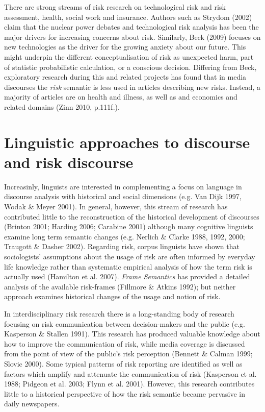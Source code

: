 \documentclass{report}
\begin{document}
There are strong streams of risk research on technological risk and risk assessment, health, social work and insurance. Authors such as Strydom (2002) claim that the nuclear power debates and technological risk analysis has been the major drivers for increasing concerns about risk. Similarly, Beck (2009) focuses on new technologies as the driver for the growing anxiety about our future. This might underpin the different conceptualisation of risk as unexpected harm, part of statistic probabilistic calculation, or a conscious decision. Differing from Beck, exploratory research during this and related projects has found that in media discourses the \emph{risk} semantic is less used in articles describing new risks. Instead, a majority of articles are on health and illness, as well as and economics and related domains (Zinn 2010, p.111f.).

\section{Linguistic approaches to discourse and risk discourse}

Increasinly, linguists are interested in complementing a focus on language in discourse analysis with historical and social dimensions (e.g. Van Dijk 1997, Wodak \& Meyer 2001). In general, however, this stream of research has contributed little to the reconstruction of the historical development of discourses (Brinton 2001; Harding 2006; Carabine 2001) although many cognitive linguists examine long term semantic changes (e.g. Nerlich \& Clarke 1988, 1992, 2000; Traugott \& Dasher 2002). Regarding risk, corpus linguists have shown that sociologists' assumptions about the usage of risk are often informed by everyday life knowledge rather than systematic empirical analysis of how the term risk is actually used (Hamilton et al. 2007). \emph{Frame Semantics} has provided a detailed analysis of the available risk-frames (Fillmore \& Atkins 1992); but neither approach examines historical changes of the usage and notion of risk.

In interdisciplinary risk research there is a long-standing body of research focusing on risk communication between decision-makers and the public (e.g. Kasperson \& Stallen 1991). This research has produced valuable knowledge about how to improve the communication of risk, while media coverage is discussed from the point of view of the public's risk perception (Bennett \& Calman 1999; Slovic 2000). Some typical patterns of risk reporting are identified as well as factors which amplify and attenuate the communication of risk (Kasperson et al. 1988; Pidgeon et al. 2003; Flynn et al. 2001). However, this research contributes little to a historical perspective of how the risk semantic became pervasive in daily newspapers. 
\end{document}
